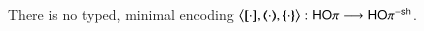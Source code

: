 %
%

%
%
%
%



\begin{theorem}%
	There is no typed, minimal encoding $\enco{\map{\cdot}, \mapt{\cdot}, \mapa{\cdot}}: \HOp \longrightarrow \HOp^{\minussh}$.
\end{theorem}

